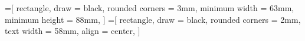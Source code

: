 \documentclass[a4paper]{article}
\begin{document}
=[
  rectangle,
  draw = black,
  rounded corners = 3mm,
  minimum width = 63mm,
  minimum height = 88mm,
]
=[
  rectangle,
  draw = black,
  rounded corners = 2mm,
  text width = 58mm,
  align = center,
]
\newcommand\carte[4]{%
  \begin{tikzpicture}
    \node[carte] {};
    \node[cadre] (A) at (0,4) {#1\hfill#2};
    \node[cadre] (B) [below=2mm of A] {\textbf{#3}};
    \node[cadre, draw=white] (C) [below=2mm of B] {#4};
  \end{tikzpicture}%
}

\end{document}
